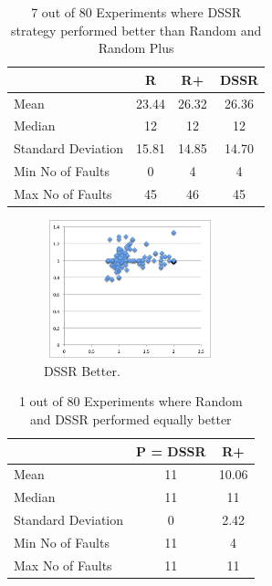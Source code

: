 \documentclass[conference]{IEEEtran}
\begin{document}
\begin{table}[H]
\caption{7 out of 80 Experiments where DSSR strategy performed better than Random and Random Plus}
\centering
\begin{tabular}{|l|c|c|c|}
\hline\hline
 				& R			& R+ 			& DSSR \\
\hline
Mean  			&    23.44		&  26.32			&  26.36\\
Median 			&    12 		&  12 			&  12 \\
Standard Deviation 	&    15.81		&  14.85			&  14.70\\
Min No of Faults	&    0			&  4				&  4\\
Max No of Faults 	&    45		&  46				&  45\\
\hline
\end{tabular}
\label{table:DSSRbetter}
\end{table}


\begin{figure}[H]
\centering
\includegraphics[width=5cm,height=4cm]{DSSRbetter5.png}
\caption{DSSR Better.}
\label{fig:DSSRbetter}
\end{figure}





\begin{table}[H]
\caption{1 out of 80 Experiments where Random and DSSR performed equally better}
\centering
\begin{tabular}{|l|c|c|}
\hline\hline
 				& P = DSSR			&  R+ \\
\hline
Mean  			&    11				&  10.06\\
Median 			&    11 				&  11\\
Standard Deviation 	&    0					&  2.42\\
Min No of Faults	&    11				&  4\\
Max No of Faults 	&    11				&  11\\
\hline
\end{tabular}
\label{table:DSSRequaltoRandom}
\end{table}
\end{document}
